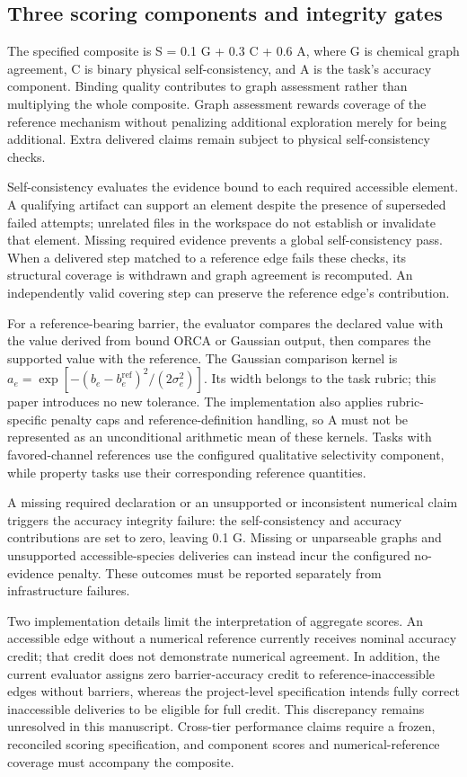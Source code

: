 \documentclass[11pt,a4paper]{article}
\begin{document}
\subsection{Three scoring components and integrity gates}
The specified composite is S = 0.1 G + 0.3 C + 0.6 A, where G is chemical graph agreement, C is binary physical self-consistency, and A is the task's accuracy component. Binding quality contributes to graph assessment rather than multiplying the whole composite. Graph assessment rewards coverage of the reference mechanism without penalizing additional exploration merely for being additional. Extra delivered claims remain subject to physical self-consistency checks.

Self-consistency evaluates the evidence bound to each required accessible element. A qualifying artifact can support an element despite the presence of superseded failed attempts; unrelated files in the workspace do not establish or invalidate that element. Missing required evidence prevents a global self-consistency pass. When a delivered step matched to a reference edge fails these checks, its structural coverage is withdrawn and graph agreement is recomputed. An independently valid covering step can preserve the reference edge's contribution.

For a reference-bearing barrier, the evaluator compares the declared value with the value derived from bound ORCA or Gaussian output, then compares the supported value with the reference. The Gaussian comparison kernel is $a_e = \exp[-(b_e-b_e^{\mathrm{ref}})^2/(2\sigma_e^2)]$. Its width belongs to the task rubric; this paper introduces no new tolerance. The implementation also applies rubric-specific penalty caps and reference-definition handling, so A must not be represented as an unconditional arithmetic mean of these kernels. Tasks with favored-channel references use the configured qualitative selectivity component, while property tasks use their corresponding reference quantities.

A missing required declaration or an unsupported or inconsistent numerical claim triggers the accuracy integrity failure: the self-consistency and accuracy contributions are set to zero, leaving 0.1 G. Missing or unparseable graphs and unsupported accessible-species deliveries can instead incur the configured no-evidence penalty. These outcomes must be reported separately from infrastructure failures.

Two implementation details limit the interpretation of aggregate scores. An accessible edge without a numerical reference currently receives nominal accuracy credit; that credit does not demonstrate numerical agreement. In addition, the current evaluator assigns zero barrier-accuracy credit to reference-inaccessible edges without barriers, whereas the project-level specification intends fully correct inaccessible deliveries to be eligible for full credit. This discrepancy remains unresolved in this manuscript. Cross-tier performance claims require a frozen, reconciled scoring specification, and component scores and numerical-reference coverage must accompany the composite.
\end{document}
